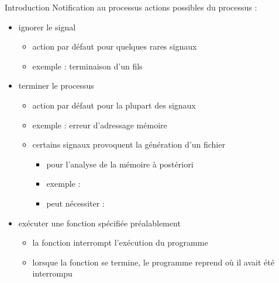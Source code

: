 \begin {frame} {Introduction}
    Notification au processus \implique actions possibles du processus :

    \begin {itemize}
	\item ignorer le signal
	    \begin {itemize}
		\item action par défaut pour quelques rares signaux
		\item exemple :  \implique terminaison
		    d'un fils
	    \end {itemize}
	\item terminer le processus
	    \begin {itemize}
		\item action par défaut pour la plupart des signaux
		\item exemple :  \implique erreur
		    d'adressage mémoire
		\item certains signaux provoquent la génération d'un
		    fichier 
		    \begin {itemize}
			\item pour l'analyse de la mémoire à postériori
			\item exemple : 
			\item peut nécessiter : 

		    \end {itemize}
	    \end {itemize}
	\item exécuter une fonction spécifiée préalablement
	    \begin {itemize}
		\item la fonction interrompt l'exécution du programme
		\item lorsque la fonction se termine, le programme reprend
		    où il avait été interrompu
	    \end {itemize}
    \end {itemize}
\end {frame}

